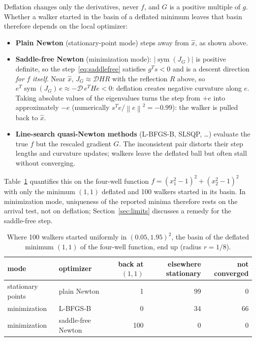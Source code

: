 \documentclass[11pt]{article}
\newcommand{\norm}[1]{\left\lVert #1 \right\rVert}
\newcommand{\xh}{\hat{x}}
\DeclareMathOperator{\sym}{sym}
\begin{document}
Deflation changes only the derivatives, never $f$, and $G$ is a positive multiple of $g$.
Whether a walker started in the basin of a deflated minimum leaves that basin therefore depends
on the local optimizer:
\begin{itemize}
  \item \textbf{Plain Newton} (stationary-point mode) steps away from $\xh$, as shown above.
  \item \textbf{Saddle-free Newton} (minimization mode): $|\sym(J_G)|$ is positive definite, so
  the step~\eqref{eq:saddlefree} satisfies $g^T s < 0$ and is a descent direction \emph{for $f$
  itself}. Near $\xh$, $J_G \approx \mathcal{D} H R$ with the reflection $R$ above, so
  $e^T \sym(J_G)\, e \approx -\mathcal{D}\, e^T H e < 0$: deflation creates negative curvature
  along $e$. Taking absolute values of the eigenvalues turns the step from $+e$ into
  approximately $-e$ (numerically $s^Te/\norm{e}^2 = -0.99$): the walker is pulled back to $\xh$.
  \item \textbf{Line-search quasi-Newton methods} (L-BFGS-B, SLSQP, \ldots) evaluate the true
  $f$ but the rescaled gradient $G$. The inconsistent pair distorts their step lengths and
  curvature updates; walkers leave the deflated ball but often stall without converging.
\end{itemize}
Table~\ref{tab:defl-methods} quantifies this on the four-well function
$f = (x_1^2-1)^2 + (x_2^2-1)^2$ with only the minimum $(1,1)$ deflated and 100 walkers started
in its basin. In minimization mode, uniqueness of the reported minima therefore rests on the
arrival test, not on deflation; Section~\ref{sec:limits} discusses a remedy for the saddle-free
step.

\begin{table}[t]
\centering
\caption{Where 100 walkers started uniformly in $(0.05, 1.95)^2$, the basin of the deflated
minimum $(1,1)$ of the four-well function, end up (radius $r = 1/8$).}
\label{tab:defl-methods}
\begin{tabular}{llrrr}
\toprule
mode & optimizer & back at $(1,1)$ & elsewhere stationary & not converged \\
\midrule
stationary points & plain Newton & 1 & 99 & 0 \\
minimization & L-BFGS-B & 0 & 34 & 66 \\
minimization & saddle-free Newton & 100 & 0 & 0 \\
\bottomrule
\end{tabular}
\end{table}
\end{document}
